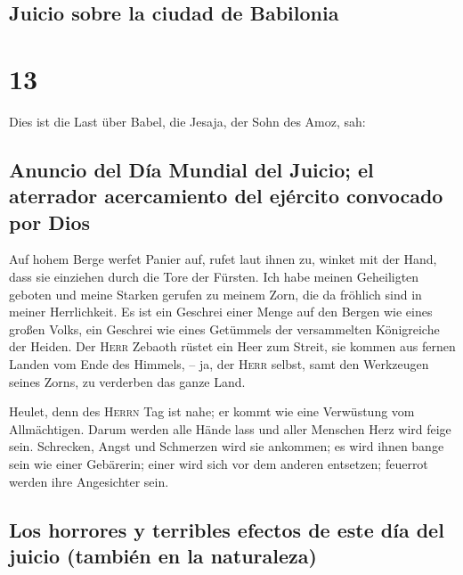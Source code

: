 \hypertarget{juicio-sobre-la-ciudad-de-babilonia}{%
\subsection{Juicio sobre la ciudad de
Babilonia}\label{juicio-sobre-la-ciudad-de-babilonia}}

\hypertarget{section-12}{%
\section{13}\label{section-12}}

 Dies ist die Last über Babel, die Jesaja, der Sohn des
Amoz, sah:

\hypertarget{anuncio-del-duxeda-mundial-del-juicio-el-aterrador-acercamiento-del-ejuxe9rcito-convocado-por-dios}{%
\subsection{Anuncio del Día Mundial del Juicio; el aterrador
acercamiento del ejército convocado por
Dios}\label{anuncio-del-duxeda-mundial-del-juicio-el-aterrador-acercamiento-del-ejuxe9rcito-convocado-por-dios}}

 Auf hohem Berge werfet Panier auf, rufet laut ihnen zu,
winket mit der Hand, dass sie einziehen durch die Tore der Fürsten.
 Ich habe meinen Geheiligten geboten und meine Starken
gerufen zu meinem Zorn, die da fröhlich sind in meiner Herrlichkeit.
 Es ist ein Geschrei einer Menge auf den Bergen wie eines
großen Volks, ein Geschrei wie eines Getümmels der versammelten
Königreiche der Heiden. Der \textsc{Herr} Zebaoth rüstet ein Heer zum
Streit,  sie kommen aus fernen Landen vom Ende des
Himmels, -- ja, der \textsc{Herr} selbst, samt den Werkzeugen seines
Zorns, zu verderben das ganze Land.

 Heulet, denn des \textsc{Herrn} Tag ist nahe; er kommt
wie eine Verwüstung vom Allmächtigen.  Darum werden alle
Hände lass und aller Menschen Herz wird feige sein. 
Schrecken, Angst und Schmerzen wird sie ankommen; es wird ihnen bange
sein wie einer Gebärerin; einer wird sich vor dem anderen entsetzen;
feuerrot werden ihre Angesichter sein.

\hypertarget{los-horrores-y-terribles-efectos-de-este-duxeda-del-juicio-tambiuxe9n-en-la-naturaleza}{%
\subsection{Los horrores y terribles efectos de este día del juicio
(también en la
naturaleza)}\label{los-horrores-y-terribles-efectos-de-este-duxeda-del-juicio-tambiuxe9n-en-la-naturaleza}}

